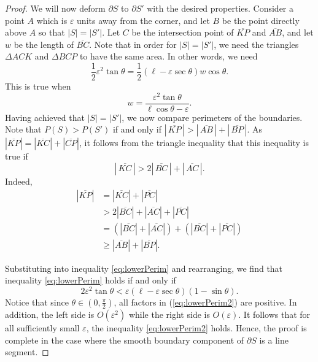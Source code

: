 \documentclass[leqno]{article}
\numberwithin{equation}{section}
\theoremstyle{definition}
\theoremstyle{remark}
\theoremstyle{plain}
\begin{document}
\begin{proof}
    We will now deform $\partial S$ to $\partial S'$ with the desired properties. Consider a point $A$ which is $\varepsilon$ units away from the corner, and let $B$ be the point directly above $A$ so that $|S| = |S'|$. Let $C$ be the intersection point of $\overline{KP}$ and $\overline{AB}$, and let $w$ be the length of $\overline{BC}$. Note that in order for $|S| = |S'|$, we need the triangles $\Delta ACK$ and $\Delta BCP$ to have the same area. In other words, we need $$\frac{1}{2}\varepsilon^2 \tan\theta = \frac{1}{2}(\ell - \varepsilon\sec\theta)w\cos\theta.$$ This is true when
    \[
        w = \frac{\varepsilon^2\tan\theta}{\ell\cos\theta - \varepsilon}.
    \]
    Having achieved that $|S| = |S'|$, we now compare perimeters of the boundaries.  Note that $P(S) > P(S')$ if and only if $\left|\,\overline{KP}\,\right| > \left|\,\overline{AB}\,\right| + \left|\,\overline{BP}\,\right|.$
    As $|\overline{KP}|  = |\overline{KC}| + |\overline{CP}|$, it follows from the triangle inequality that this inequality is true if
    \begin{equation}\label{eq:lowerPerim}
        \left|\,\overline{KC}\,\right| > 
        2\left|\,\overline{BC}\,\right| + 
        \left|\,\overline{AC}\,\right|.
    \end{equation}
    Indeed, \begin{align*} |\overline{KP}| &= |\overline{KC}|+|\overline{PC}|\\
    & > 2|\overline{BC}| +|\overline{AC}| + |\overline{PC}|\\
    &= (|\overline{BC}| + |\overline{AC}|) + (|\overline{BC}| + |\overline{PC}|)\\
    & \geq |\overline{AB}| + |\overline{BP}|.\end{align*}
    
    Substituting into inequality \eqref{eq:lowerPerim} and rearranging, we find that inequality \eqref{eq:lowerPerim} holds if and only if 
    \begin{equation}\label{eq:lowerPerim2}
        2\varepsilon^2\tan\theta < \varepsilon(\ell - \varepsilon\sec\theta)(1-\sin\theta).
    \end{equation}
    Notice that since $\theta \in (0,\tfrac{\pi}{2})$, all factors in (\ref{eq:lowerPerim2}) are positive.  In addition, the left side is $O(\varepsilon^2)$ while the right side is $O(\varepsilon)$.  It follows that for all sufficiently small $\varepsilon$, the inequality \eqref{eq:lowerPerim2} holds. Hence, the proof is complete in the case where the smooth boundary component of $\partial S$ is a line segment.


\end{proof}
\end{document}
